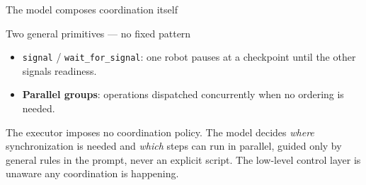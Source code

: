 \documentclass[aspectratio=169,11pt]{beamer}
\begin{document}
\begin{frame}{The model composes coordination itself}
	\begin{block}{Two general primitives --- no fixed pattern}
		\begin{itemize}
			\item \texttt{signal} / \texttt{wait\_for\_signal}: one robot pauses at a checkpoint
			      until the other signals readiness.
			\item \textbf{Parallel groups}: operations dispatched concurrently when no ordering is needed.
		\end{itemize}
	\end{block}
	\vfill
	The executor imposes \alert{no} coordination policy. The model decides \emph{where}
	synchronization is needed and \emph{which} steps can run in parallel, guided only by
	general rules in the prompt, never an explicit script.
	\vfill
	\footnotesize The low-level control layer is unaware any coordination is happening.
\end{frame}
\end{document}
